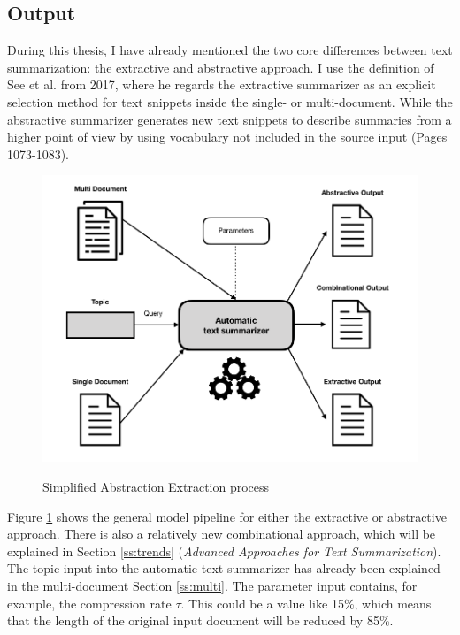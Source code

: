 \subsection{Output}\label{ss:exabs}

During this thesis, I have already mentioned the two core differences between text summarization: the extractive and abstractive approach. I use the definition of See et al. from 2017, where he regards the extractive summarizer as an explicit selection method for text snippets inside the single- or multi-document. While the abstractive summarizer generates new text snippets to describe summaries from a higher point of view by using vocabulary not included in the source input \cite{see-etal-2017-get} (Pages 1073-1083). 

\begin{figure}
	\begin{center}
		\includegraphics[width=5in]{photos/abex}\\
		\caption{Simplified Abstraction Extraction process}\label{abex}
	\end{center}
\end{figure}

Figure \ref{abex} shows the general model pipeline for either the extractive or abstractive approach. There is also a relatively new combinational approach, which will be explained in Section \ref{ss:trends} (\textit{Advanced Approaches for Text Summarization}). The topic input into the automatic text summarizer has already been explained in the multi-document Section \ref{ss:multi}. The parameter input contains, for example, the compression rate \(\tau\). This could be a value like 15\%, which means that the length of the original input document will be reduced by 85\%.

